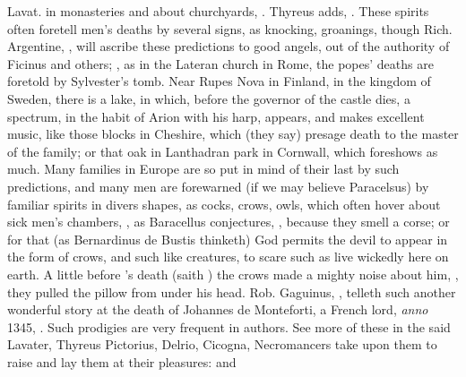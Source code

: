 Lavat.  in monasteries and about
churchyards, . Thyreus adds, . These spirits often foretell men's deaths by several signs, as
knocking, groanings, \etc{} though Rich. Argentine,
, will ascribe these
predictions to good angels, out of the authority of Ficinus and others;
, as in the Lateran church in
Rome, the popes' deaths are foretold by Sylvester's tomb.
Near Rupes Nova in Finland, in the kingdom of Sweden, there is a lake, in
which, before the governor of the castle dies, a spectrum, in the habit of
Arion with his harp, appears, and makes excellent music, like those blocks in
Cheshire, which (they say) presage death to the master of the family; or that
oak in Lanthadran park in Cornwall, which foreshows as
much. Many families in Europe are so put in mind of their last by such
predictions, and many men are forewarned (if we may believe Paracelsus) by
familiar spirits in divers shapes, as cocks, crows, owls, which often hover
about sick men's chambers, , as
Baracellus conjectures, , because they smell a corse; or for that (as
Bernardinus de Bustis thinketh) God permits the devil to
appear in the form of crows, and such like creatures, to scare such as live
wickedly here on earth. A little before \Tully{}'s death (saith \Plutarch{}) the
crows made a mighty noise about him, , they pulled
the pillow from under his head. Rob. Gaguinus, , telleth such another wonderful story at the death of Johannes
de Monteforti, a French lord, \emph{anno} 1345, . Such prodigies are very frequent in authors. See more of
these in the said Lavater, Thyreus  Pictorius, Delrio, Cicogna,  Necromancers take upon them to raise and lay them at their pleasures: and
